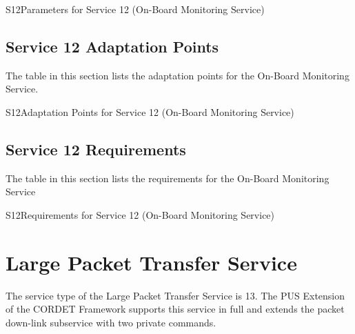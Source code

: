 \documentclass{pnp_article}
\begin{document}
\begin{cr_par}{S12}{Parameters for Service 12 (On-Board Monitoring Service)}
\end{cr_par}

\subsection{Service 12 Adaptation Points}
The table in this section lists the adaptation points for the On-Board Monitoring Service.

\begin{cr_ap}{S12}{Adaptation Points for Service 12 (On-Board Monitoring Service)}
\end{cr_ap}


\subsection{Service 12 Requirements}
The table in this section lists the requirements for the On-Board Monitoring Service

\begin{cr_req}{S12}{Requirements for Service 12 (On-Board Monitoring Service)}
\end{cr_req}










\section{Large Packet Transfer Service}\label{sec:serv13}
The service type of the Large Packet Transfer Service is 13. The PUS Extension of the CORDET Framework supports this service in full and extends the packet down-link subservice with two private commands.
\end{document}
